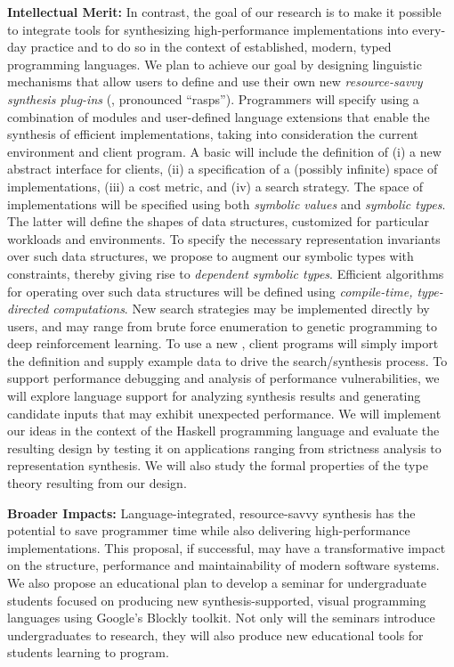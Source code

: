 \documentclass[12pt]{article}
\begin{document}
\noindent
\textbf{Intellectual Merit:}
In contrast, the goal of our research is to make it possible to integrate
tools for synthesizing high-performance implementations into every-day 
practice and to do so in the context of 
established, modern, typed programming languages.  
We plan to achieve our goal
by designing linguistic mechanisms that allow users to define and use 
their own new \emph{resource-savvy synthesis plug-ins} (\rasps,
pronounced ``rasps'').
Programmers will specify \rasps
using a combination of modules and user-defined
language extensions that enable the
synthesis of efficient implementations, taking into consideration the current
environment and client program.  A basic \rasp will include the definition
of (i) a new abstract interface for clients, (ii) a specification of a
(possibly infinite) space of implementations, (iii)
a cost metric, and (iv) a search strategy.  
The space of implementations
will be specified using both \emph{symbolic values} and \emph{symbolic types}.
The latter will define the shapes of data structures, customized for
particular workloads and environments.  To specify the necessary representation 
invariants over such data structures, we propose to augment our
symbolic types with constraints, thereby giving rise to \emph{dependent
symbolic types}.
Efficient algorithms for operating over such data structures will be defined
using \emph{compile-time, type-directed computations}.  New 
search strategies may be implemented directly by users, and may range from
brute force enumeration to genetic programming to deep reinforcement learning.
To use a new \rasp, client programs will simply import the \rasp definition
and supply example data to drive the search/synthesis process.
To support performance debugging and analysis of performance vulnerabilities,
we will explore language support for analyzing synthesis 
results and generating candidate inputs that may exhibit unexpected 
performance.  We will implement our ideas in the context of the
Haskell programming language and evaluate the resulting design by testing
it on applications ranging from strictness analysis to
representation synthesis.  We will also study the formal properties of the
type theory resulting from our design.

\noindent
\textbf{Broader Impacts:} 
Language-integrated, resource-savvy synthesis has the potential to
save programmer time while also delivering high-performance implementations.
This proposal, if successful, may have a transformative impact on the
structure, performance and maintainability of modern software systems.
We also propose an educational plan to develop a seminar for 
undergraduate students focused on producing new synthesis-supported,
visual programming languages using Google's Blockly toolkit.  Not only
will the seminars introduce undergraduates to research, they will also
produce new educational tools for students learning to program.
\end{document}
